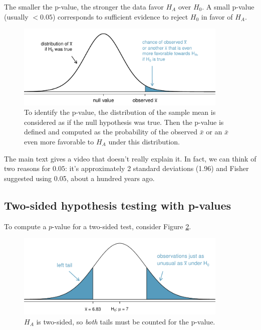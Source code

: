 \begin{termBox}{
The smaller the p-value, the stronger the data favor $H_A$ over $H_0$. A small p-value (usually $<0.05$) corresponds to sufficient evidence to reject $H_0$ in favor of $H_A$.}
\end{termBox}


\begin{figure}%
   \centering
   \includegraphics[width=0.9\textwidth]{ch_inference_foundations/figures/pValueOneSidedSleepStudyExplained/pValueOneSidedSleepStudyExplained}
   \caption{To identify the p-value, the distribution of the sample mean is considered as if the null hypothesis was true. Then the p-value is defined and computed as the probability of the observed $\bar{x}$ or an $\bar{x}$ even more favorable to $H_A$ under this distribution.}
   \label{pValueOneSidedSleepStudyExplained}
\end{figure}

\begin{termBox}{
The main text gives a video that doesn't really explain it. In fact, we can think of two reasons for $0.05$: it's approximately 2 standard deviations (1.96) and Fisher suggested using 0.05, about a hundred years ago.}
\end{termBox}


\subsection{Two-sided hypothesis testing with p-values}
\label{twoSidedTestsWithPValues}


To compute a $p$-value for a two-sided test, consider Figure \ref{2ndSchSleepHTExample}.
\begin{figure}
   \centering
   \includegraphics[width=0.9\textwidth]{ch_inference_foundations/figures/2ndSchSleepHTExample/2ndSchSleepHTExample}
   \caption{$H_A$ is two-sided, so \emph{both} tails must be counted for the p-value.}
   \label{2ndSchSleepHTExample}
\end{figure}



